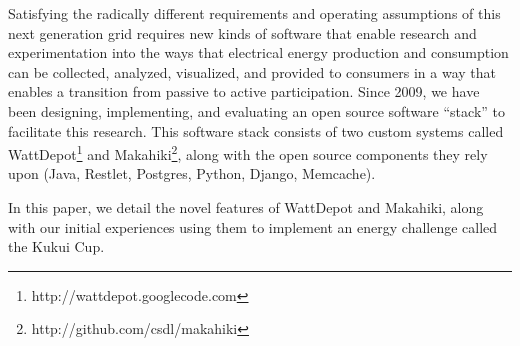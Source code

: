 Satisfying the radically different requirements and operating assumptions of this next generation grid requires new kinds of software that enable research and experimentation into the ways that electrical energy production and consumption can be collected, analyzed, visualized, and provided to consumers in a way that enables a transition from passive to active participation.  Since 2009, we have been designing, implementing, and evaluating an open source software ``stack'' to facilitate this research.  This software stack consists of two custom systems called WattDepot\footnote{http://wattdepot.googlecode.com} and Makahiki\footnote{http://github.com/csdl/makahiki}, along with the open source components they rely upon (Java, Restlet, Postgres, Python, Django, Memcache).

In this paper, we detail the novel features of WattDepot and Makahiki,  along with our initial experiences using
them to implement an energy challenge called the Kukui Cup.
